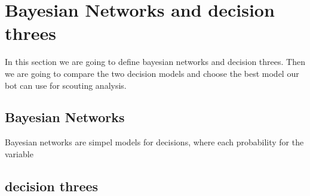 \section{Bayesian Networks and decision threes}
In this section we are going to define bayesian networks and decision threes. Then we are going to compare the two decision models and choose
the best model our bot can use for scouting analysis.

\subsection{Bayesian Networks}
Bayesian networks are simpel models for decisions, where each probability for the variable 

\subsection{decision threes}